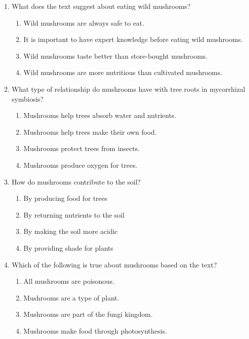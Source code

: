 \documentclass[12pt]{article}
\begin{document}
\begin{enumerate}
    \item What does the text suggest about eating wild mushrooms?
    \begin{enumerate}[label=\Alph*.]
        \item Wild mushrooms are always safe to eat.
        \item It is important to have expert knowledge before eating wild mushrooms.
        \item Wild mushrooms taste better than store-bought mushrooms.
        \item Wild mushrooms are more nutritious than cultivated mushrooms.
    \end{enumerate}
    \vspace{0.5cm}

    \item What type of relationship do mushrooms have with tree roots in mycorrhizal symbiosis?
    \begin{enumerate}[label=\Alph*.]
        \item Mushrooms help trees absorb water and nutrients.
        \item Mushrooms help trees make their own food.
        \item Mushrooms protect trees from insects.
        \item Mushrooms produce oxygen for trees.
    \end{enumerate}
    \vspace{0.5cm}

    \item How do mushrooms contribute to the soil?
    \begin{enumerate}[label=\Alph*.]
        \item By producing food for trees
        \item By returning nutrients to the soil
        \item By making the soil more acidic
        \item By providing shade for plants
    \end{enumerate}
    \vspace{0.5cm}

    \item Which of the following is true about mushrooms based on the text?
    \begin{enumerate}[label=\Alph*.]
        \item All mushrooms are poisonous.
        \item Mushrooms are a type of plant.
        \item Mushrooms are part of the fungi kingdom.
        \item Mushrooms make food through photosynthesis.
    \end{enumerate}
    \vspace{0.5cm}


\end{enumerate}
\end{document}
